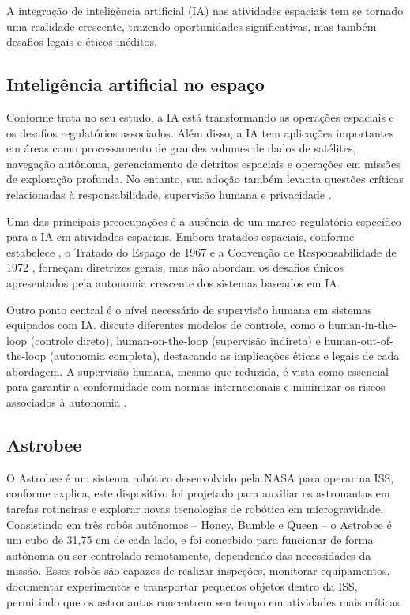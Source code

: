 A integração de inteligência artificial (IA) nas atividades espaciais tem se tornado uma realidade crescente, trazendo oportunidades significativas, mas também desafios legais e éticos inéditos. 

\subsection{Inteligência artificial no espaço}

Conforme \citep{martin2021} trata no seu estudo, a IA está transformando as operações espaciais e os desafios regulatórios associados. Além disso, a IA tem aplicações importantes em áreas como processamento de grandes volumes de dados de satélites, navegação autônoma, gerenciamento de detritos espaciais e operações em missões de exploração profunda. No entanto, sua adoção também levanta questões críticas relacionadas à responsabilidade, supervisão humana e privacidade \citep{martin2021}.

Uma das principais preocupações é a ausência de um marco regulatório específico para a IA em atividades espaciais. Embora tratados espaciais, conforme estabelece \citep{unodaOuterSpaceTreaty}, o Tratado do Espaço de 1967 e a Convenção de Responsabilidade de 1972 \citep{camaraDecreto77}, forneçam diretrizes gerais, mas não abordam os desafios únicos apresentados pela autonomia crescente dos sistemas baseados em IA.

Outro ponto central é o nível necessário de supervisão humana em sistemas equipados com IA. \citep{martin2021} discute diferentes modelos de controle, como o human-in-the-loop (controle direto), human-on-the-loop (supervisão indireta) e human-out-of-the-loop (autonomia completa), destacando as implicações éticas e legais de cada abordagem. A supervisão humana, mesmo que reduzida, é vista como essencial para garantir a conformidade com normas internacionais e minimizar os riscos associados à autonomia \citep{martin2021}.

\subsection{Astrobee}

O Astrobee é um sistema robótico desenvolvido pela NASA para operar na ISS, conforme \citep{nasaAstrobee} explica, este dispositivo foi projetado para auxiliar os astronautas em tarefas rotineiras e explorar novas tecnologias de robótica em microgravidade. Consistindo em três robôs autônomos – Honey, Bumble e Queen – o Astrobee é um cubo de 31,75 cm de cada lado, e foi concebido para funcionar de forma autônoma ou ser controlado remotamente, dependendo das necessidades da missão. Esses robôs são capazes de realizar inspeções, monitorar equipamentos, documentar experimentos e transportar pequenos objetos dentro da ISS, permitindo que os astronautas concentrem seu tempo em atividades mais críticas.

